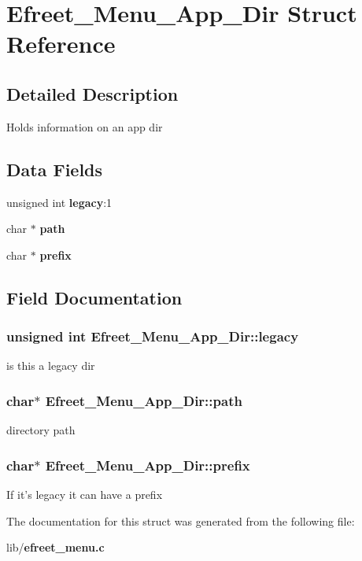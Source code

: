\section{Efreet\_\-Menu\_\-App\_\-Dir Struct Reference}
\label{structEfreet__Menu__App__Dir}


\subsection{Detailed Description}
Holds information on an app dir \subsection*{Data Fields}
\begin{CompactItemize}
\item 
unsigned int {\bf legacy}:1
\item 
char $\ast$ {\bf path}
\item 
char $\ast$ {\bf prefix}
\end{CompactItemize}


\subsection{Field Documentation}
\subsubsection[legacy]{\setlength{\rightskip}{0pt plus 5cm}unsigned int {\bf Efreet\_\-Menu\_\-App\_\-Dir::legacy}}\label{structEfreet__Menu__App__Dir_23534a6082c5ef83d55fa0e3a95da6cd}


is this a legacy dir 
\subsubsection[path]{\setlength{\rightskip}{0pt plus 5cm}char$\ast$ {\bf Efreet\_\-Menu\_\-App\_\-Dir::path}}\label{structEfreet__Menu__App__Dir_6f8402c8df46598efddbf2d5bc1ffc4f}


directory path 
\subsubsection[prefix]{\setlength{\rightskip}{0pt plus 5cm}char$\ast$ {\bf Efreet\_\-Menu\_\-App\_\-Dir::prefix}}\label{structEfreet__Menu__App__Dir_5f3c6f6ba91f59537f2bdcd92c0cae0e}


If it's legacy it can have a prefix 

The documentation for this struct was generated from the following file:\begin{CompactItemize}
\item 
lib/{\bf efreet\_\-menu.c}\end{CompactItemize}
